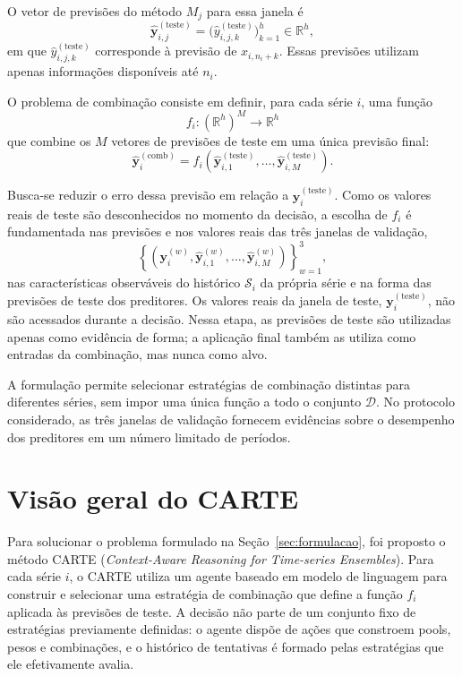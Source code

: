 O vetor de previsões do método $M_j$ para essa janela é
\[
    \hat{\mathbf{y}}_{i,j}^{(\mathrm{teste})}
    =
    \bigl(\hat{y}_{i,j,k}^{(\mathrm{teste})}\bigr)_{k=1}^{h}
    \in \mathbb{R}^{h},
\]
em que $\hat{y}_{i,j,k}^{(\mathrm{teste})}$ corresponde à previsão de $x_{i,n_i+k}$. Essas previsões utilizam apenas informações disponíveis até $n_i$.

O problema de combinação consiste em definir, para cada série $i$, uma função
\[
    f_i : (\mathbb{R}^{h})^{M} \longrightarrow \mathbb{R}^{h}
\]
que combine os $M$ vetores de previsões de teste em uma única previsão final:
\[
    \hat{\mathbf{y}}_i^{(\mathrm{comb})}
    =
    f_i\!\left(
        \hat{\mathbf{y}}_{i,1}^{(\mathrm{teste})},
        \ldots,
        \hat{\mathbf{y}}_{i,M}^{(\mathrm{teste})}
    \right).
\]

Busca-se reduzir o erro dessa previsão em relação a $\mathbf{y}_i^{(\mathrm{teste})}$. Como os valores reais de teste são desconhecidos no momento da decisão, a escolha de $f_i$ é fundamentada nas previsões e nos valores reais das três janelas de validação,
\[
    \left\{
        \left(
            \mathbf{y}_i^{(w)},
            \hat{\mathbf{y}}_{i,1}^{(w)},
            \ldots,
            \hat{\mathbf{y}}_{i,M}^{(w)}
        \right)
    \right\}_{w=1}^{3},
\]
nas características observáveis do histórico $\mathcal{S}_i$ da própria série e na forma das previsões de teste dos preditores. Os valores reais da janela de teste, $\mathbf{y}_i^{(\mathrm{teste})}$, não são acessados durante a decisão. Nessa etapa, as previsões de teste são utilizadas apenas como evidência de forma; a aplicação final também as utiliza como entradas da combinação, mas nunca como alvo.

A formulação permite selecionar estratégias de combinação distintas para diferentes séries, sem impor uma única função a todo o conjunto $\mathcal{D}$. No protocolo considerado, as três janelas de validação fornecem evidências sobre o desempenho dos preditores em um número limitado de períodos.





\section{Visão geral do CARTE} \label{sec:carte}
Para solucionar o problema formulado na Seção~\ref{sec:formulacao}, foi proposto o método CARTE (\textit{Context-Aware Reasoning for Time-series Ensembles}). Para cada série $i$, o CARTE utiliza um agente baseado em modelo de linguagem para construir e selecionar uma estratégia de combinação que define a função $f_i$ aplicada às previsões de teste. A decisão não parte de um conjunto fixo de estratégias previamente definidas: o agente dispõe de ações que constroem pools, pesos e combinações, e o histórico de tentativas é formado pelas estratégias que ele efetivamente avalia.

